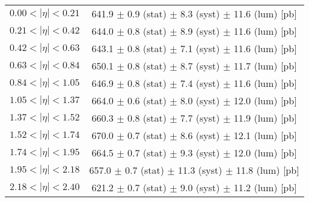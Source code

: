 \begin{tabular}{lc}
\hline
$0.00 < |\eta| <0.21$          & 641.9 $\pm$ 0.9 (stat) $\pm$ 8.3 (syst) $\pm$ 11.6 (lum) [pb]  \\
$0.21 < |\eta| <0.42$          & 644.0 $\pm$ 0.8 (stat) $\pm$ 8.9 (syst) $\pm$ 11.6 (lum) [pb]  \\
$0.42 < |\eta| <0.63$          & 643.1 $\pm$ 0.8 (stat) $\pm$ 7.1 (syst) $\pm$ 11.6 (lum) [pb]  \\
$0.63 < |\eta| <0.84$          & 650.1 $\pm$ 0.8 (stat) $\pm$ 8.7 (syst) $\pm$ 11.7 (lum) [pb]  \\
$0.84 < |\eta| <1.05$          & 646.9 $\pm$ 0.8 (stat) $\pm$ 7.4 (syst) $\pm$ 11.6 (lum) [pb]  \\
$1.05 < |\eta| <1.37$          & 664.0 $\pm$ 0.6 (stat) $\pm$ 8.0 (syst) $\pm$ 12.0 (lum) [pb]  \\
$1.37 < |\eta| <1.52$          & 660.3 $\pm$ 0.8 (stat) $\pm$ 7.7 (syst) $\pm$ 11.9 (lum) [pb]  \\
$1.52 < |\eta| <1.74$          & 670.0 $\pm$ 0.7 (stat) $\pm$ 8.6 (syst) $\pm$ 12.1 (lum) [pb]  \\
$1.74 < |\eta| <1.95$          & 664.5 $\pm$ 0.7 (stat) $\pm$ 9.3 (syst) $\pm$ 12.0 (lum) [pb]  \\
$1.95 < |\eta| <2.18$          & 657.0 $\pm$ 0.7 (stat) $\pm$ 11.3 (syst) $\pm$ 11.8 (lum) [pb]  \\
$2.18 < |\eta| <2.40$          & 621.2 $\pm$ 0.7 (stat) $\pm$ 9.0 (syst) $\pm$ 11.2 (lum) [pb]  \\
\hline
\end{tabular}
